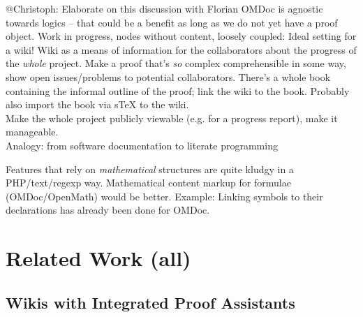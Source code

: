 \documentclass{llncs}
\begin{document}
\begin{todo}{@Christoph: Elaborate on this discussion with Florian}
  OMDoc is agnostic towards logics -- that could be a benefit as long as we do not yet
  have a proof object. Work in progress, nodes without content, loosely coupled: Ideal
  setting for a wiki!  Wiki as a means of information for the collaborators about the
  progress of the \emph{whole} project.  Make a proof that's \emph{so} complex
  comprehensible in some way, show open issues/problems to potential collaborators.
  There's a whole book containing the informal outline of the proof; link the wiki to the
  book.  Probably also import the book via sTeX to the wiki.\\
  Make the whole project publicly viewable (e.g. for a progress report), make it
  manageable.\\
  Analogy: from software documentation to literate programming
\end{todo}

Features that rely on \emph{mathematical} structures are quite kludgy in a PHP/text/regexp
way.  Mathematical content markup for formulae (OMDoc/OpenMath) would be better.  Example:
Linking symbols to their declarations has already been done for OMDoc.



\section{Related Work (all)}
\label{sec:related}


\subsection{Wikis with Integrated Proof Assistants}
\label{sec:wiki-pa}
\end{document}
